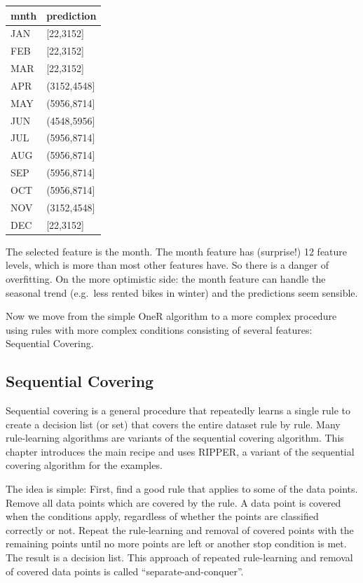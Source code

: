 \documentclass[12pt,]{krantz}
\begin{document}
\begin{tabular}{l|l}
\hline
mnth & prediction\\
\hline
JAN & [22,3152]\\
\hline
FEB & [22,3152]\\
\hline
MAR & [22,3152]\\
\hline
APR & (3152,4548]\\
\hline
MAY & (5956,8714]\\
\hline
JUN & (4548,5956]\\
\hline
JUL & (5956,8714]\\
\hline
AUG & (5956,8714]\\
\hline
SEP & (5956,8714]\\
\hline
OCT & (5956,8714]\\
\hline
NOV & (3152,4548]\\
\hline
DEC & [22,3152]\\
\hline
\end{tabular}

The selected feature is the month. The month feature has (surprise!) 12
feature levels, which is more than most other features have. So there is
a danger of overfitting. On the more optimistic side: the month feature
can handle the seasonal trend (e.g.~less rented bikes in winter) and the
predictions seem sensible.

Now we move from the simple OneR algorithm to a more complex procedure
using rules with more complex conditions consisting of several features:
Sequential Covering.

\subsection{Sequential Covering}\label{sequential-covering}

Sequential covering is a general procedure that repeatedly learns a
single rule to create a decision list (or set) that covers the entire
dataset rule by rule. Many rule-learning algorithms are variants of the
sequential covering algorithm. This chapter introduces the main recipe
and uses RIPPER, a variant of the sequential covering algorithm for the
examples.

The idea is simple: First, find a good rule that applies to some of the
data points. Remove all data points which are covered by the rule. A
data point is covered when the conditions apply, regardless of whether
the points are classified correctly or not. Repeat the rule-learning and
removal of covered points with the remaining points until no more points
are left or another stop condition is met. The result is a decision
list. This approach of repeated rule-learning and removal of covered
data points is called ``separate-and-conquer''.
\end{document}
